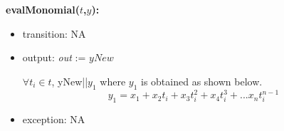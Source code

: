 \documentclass[12pt, titlepage]{article}
\begin{document}
\noindent \textbf{evalMonomial($t$,$y$):}
\begin{itemize}
	\item transition: NA
	
	\item output:  \textit{out} := $yNew$
	
	$\forall t_i \in t$, yNew||$y_1$ where $y_1$ is obtained as shown below.
	\begin{equation*}
	y_1 = x_1 + x_2 t_i + x_3 t_i ^2 + x_4 t_i ^3 + ... x_n t_i ^{n-1}  
	\end{equation*}
	
	\item exception: NA
\end{itemize}

\end{document}
